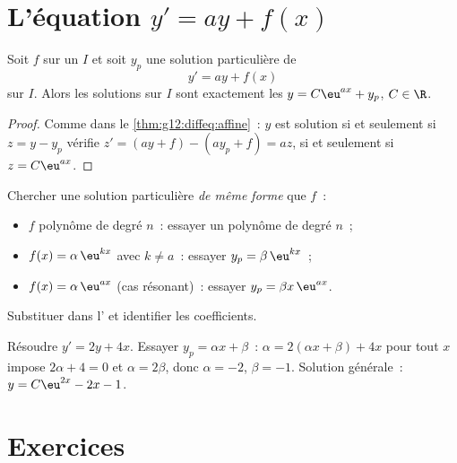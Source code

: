 \section{L'équation \texorpdfstring{$y' = ay + f(x)$}{y' = ay + f(x)}}

\begin{proposition}\label{prop:g12:diffeq:general}
Soit $f$  sur un  $I$ et soit $y_p$ une solution
particulière de
\[
y' = ay + f(x)
\]
sur $I$. Alors les solutions sur $I$ sont exactement les 
$y = C\eu^{ax} + y_p$, $C \in \R$.
\end{proposition}

\begin{proof}
Comme dans le \cref{thm:g12:diffeq:affine}~: $y$ est solution si et seulement
si $z = y - y_p$ vérifie
$z' = (ay + f) - (ay_p + f) = az$, si et seulement si $z = C\eu^{ax}$.
\end{proof}

\begin{method}\label{met:g12:diffeq:particular}
Chercher une solution particulière \emph{de même forme} que $f$~:
\begin{itemize}
  \item $f$ polynôme de degré $n$~: essayer un polynôme de degré $n$~;
  \item $f(x) = \alpha\,\eu^{kx}$ avec $k \neq a$~: essayer
        $y_p = \beta\,\eu^{kx}$~;
  \item $f(x) = \alpha\,\eu^{ax}$ (cas résonant)~: essayer
        $y_p = \beta x\,\eu^{ax}$.
\end{itemize}
Substituer dans l' et identifier les coefficients.
\end{method}

\begin{example}\label{ex:g12:diffeq:particular}
Résoudre $y' = 2y + 4x$. Essayer $y_p = \alpha x + \beta$~:
$\alpha = 2(\alpha x + \beta) + 4x$ pour tout $x$ impose
$2\alpha + 4 = 0$ et $\alpha = 2\beta$, donc $\alpha = -2$, $\beta = -1$.
Solution générale~: $y = C\eu^{2x} - 2x - 1$.
\end{example}

\section{Exercices}

